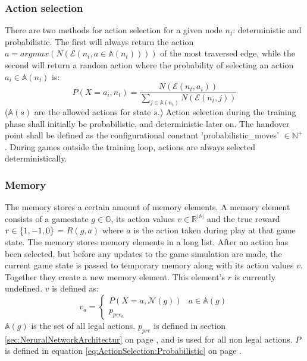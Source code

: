 \documentclass[12pt]{article}
\newcommand{\equationref}[1]{equation \ref{#1} on page \pageref{#1}}
\newcommand{\sectionref}[1]{section \ref{#1} on page \pageref{#1}}
\begin{document}
\subsubsection{Action selection}\label{sec:training:actionSelection}
There are two methods for action selection for a given node \(n_t\): deterministic and probabilistic. The first will always return the action \(a = argmax(N(\mathcal{E}(n_t, a \in \mathbb A(n_t))))\) of the most traversed edge, while the second will return a random action where the probability of selecting an action \(a_i \in \mathbb A(n_t)\) is:
\begin{equation} \label{eq:ActionSelection:Probabilistic}
P(X=a_i, n_t) = \frac{N(\mathcal{E}(n_t, a_i))}{\sum_{j \in \mathbb A(n_t)} N(\mathcal{E}(n_t, j))}
\end{equation}
(\(\mathbb A(s)\) are the allowed actions for state \(s\).) Action selection during the training phase shall initially be probabilistic, and deterministic later on. The handover point shall be defined as the configurational constant 'probabilistic\_moves' \(\in \mathbb N^+\). During games outside the training loop, actions are always selected deterministically.
 \subsubsection{Memory}
\label{sec:memory}
The memory stores a certain amount of memory elements. A memory element consists of a gamestate \(g \in \mathbb G\), its action values \(v \in \mathbb R^{|\mathbb A|}\) and the true reward \(r \in \mathbb \{1, -1, 0\}\) = \(R(g, a)\) where \(a\) is the action taken during play at that game state. The memory stores memory elements in a long list. After an action has been selected, but before any updates to the game simulation are made, the current game state is passed to temporary memory along with its action values \(v\). Together they create a new memory element. This element's \(r\) is currently undefined. \(v\) is defined as: 
\begin{equation} \label{eq:Memory:ActionValuesDefinition}
v_a = 
\begin{cases}
P(X=a, \mathcal N(g)) & a \in \mathbb A(g)\\
p_{pre_a} &
\end{cases}
\end{equation}
\(\mathbb A(g)\) is the set of all legal actions. \(p_{pre}\) is defined in \sectionref{sec:NeruralNetworkArchitectur}, and is used for all non legal actions. \(P\) is defined in \equationref{eq:ActionSelection:Probabilistic}.
\end{document}
